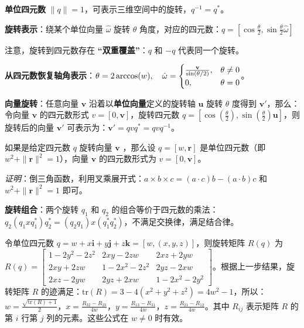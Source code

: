 \documentclass[
  8pt]{extarticle}
\begin{document}
\begin{multicols*}{4}
\textbf{单位四元数}
\(\|q\| = 1\)，可表示三维空间中的旋转，\(q^{-1} = q^*\)。

\textbf{旋转表示}：绕某个单位向量 \(\hat{\omega}\) 旋转 \(\theta\)
角度，对应的四元数：\(q = \left[\cos\frac{\theta}{2}, \sin\frac{\theta}{2} \hat{\omega}\right]\)

注意，旋转到四元数存在 \textbf{``双重覆盖''}：\(q\) 和 \(-q\)
代表同一个旋转。

\textbf{从四元数恢复轴角表示}：\(\theta = 2 \arccos(w), \quad \hat{\omega} =\begin{cases}\frac{\bold{v}}{\sin(\theta/2)}, & \theta \neq 0 \\0, & \theta = 0\end{cases}\)。

\textbf{向量旋转}：任意向量 \(\mathbf{v}\)
沿着以\textbf{单位向量}定义的旋转轴 \(\mathbf{u}\) 旋转 \(\theta\)
度得到 \(\mathbf{v}'\)，那么：令向量 \(\mathbf{v}\) 的四元数形式
\(v = [0, \mathbf{v}]\)，旋转四元数
\(q = \left[\cos\left(\frac{\theta}{2}\right), \sin\left(\frac{\theta}{2}\right)\mathbf{u}\right]\)，则旋转后的向量
\(\mathbf{v}'\) 可表示为：\(\mathbf{v}' = qv q^* = qv q^{-1}\)。

如果是给定四元数 \(q\) 旋转向量 \(\mathbf{v}\) ，那么设
\(q = [w, \mathbf{r}]\) 是单位四元数（即
\(w^2 + \|\mathbf{r}\|^2 = 1\)），向量 \(\mathbf{v}\) 的四元数形式为
\(v = [0, \mathbf{v}]\)。

\emph{证明}：倒三角函数，利用叉乘展开式：\(a \times b \times c = (a \cdot c)b - (a \cdot b)c\)
和 \(w^2 + \|\mathbf{r}\|^2 = 1\) 即可。

\textbf{旋转组合}：两个旋转 \(q_1\) 和 \(q_2\)
的组合等价于四元数的乘法：\(q_2 (q_1 x q_1^*) q_2^* = (q_2 q_1) x (q_1^* q_2^*)\)，不满足交换律，满足结合律。

令单位四元数
\(q = w + x\mathbf{i} + y\mathbf{j} + z\mathbf{k} = [w, (x, y, z)]\)，则旋转矩阵
\(R(q)\) 为
\(R(q) = \begin{bmatrix} 1 - 2y^2 - 2z^2 & 2xy - 2zw & 2xz + 2yw \\ 2xy + 2zw & 1 - 2x^2 - 2z^2 & 2yz - 2xw \\ 2xz - 2yw & 2yz + 2xw & 1 - 2x^2 - 2y^2 \end{bmatrix}\)。根据上一步结果，旋转矩阵
\(R\)
的迹满足：\(\text{tr}(R) = 3 - 4(x^2 + y^2 + z^2) = 4w^2 - 1\)，所以：\(w = \frac{\sqrt{\text{tr}(R)+1}}{2}，x = \frac{R_{32}-R_{23}}{4w}，y = \frac{R_{13}-R_{31}}{4w}，z = \frac{R_{21}-R_{12}}{4w}\)。其中
\(R_{ij}\) 表示矩阵 \(R\) 的第 \(i\) 行第 \(j\) 列的元素。这些公式在
\(w \neq 0\) 时有效。


\end{multicols*}
\end{document}
